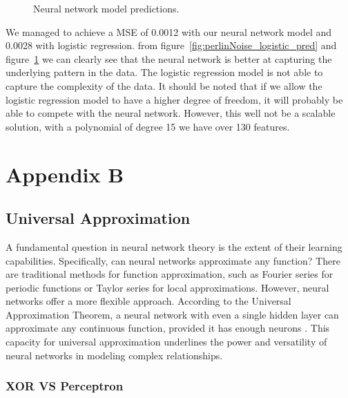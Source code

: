 \documentclass[twoside,11pt]{report}
\begin{document}
\begin{figure}[!ht]
\begin{minipage}[t]{0.5\textwidth - 1mm}
\begin{center}
            \end{center}
            \caption
            {
                Neural network model predictions.
            }\label{fig:perlinNoise_NN_pred}
        \end{minipage}
    \end{figure}


    \noindent
    We managed to achieve a MSE of 0.0012 with our neural network model and 0.0028 with logistic regression.
    from figure~\ref{fig:perlinNoise_logistic_pred} and figure~\ref{fig:perlinNoise_NN_pred} we can clearly see that
    the neural network is better at capturing the underlying pattern in the data. The logistic regression model
    is not able to capture the complexity of the data. It should be noted that if we allow the logistic regression
    model to have a higher degree of freedom, it will probably be able to compete with the neural network. However,
    this well not be a scalable solution, with a polynomial of degree 15 we have over 130 features.












\chapter*{Appendix B}
\label{app:appendixB}


\section{Universal Approximation}
\label{sec:UAT}


    A fundamental question in neural network theory is the extent of their learning capabilities. Specifically, 
    can neural networks approximate any function? There are traditional methods for function approximation, such 
    as Fourier series for periodic functions or Taylor series for local approximations. However, neural networks 
    offer a more flexible approach. According to the Universal Approximation Theorem, a neural network with even a 
    single hidden layer can approximate any continuous function, provided it has enough neurons \cite{HornikEtAl89}. 
    This capacity for universal approximation underlines the power and versatility of neural networks in modeling 
    complex relationships.


\subsection*{XOR VS Perceptron}
\label{app:xor}
\end{document}
